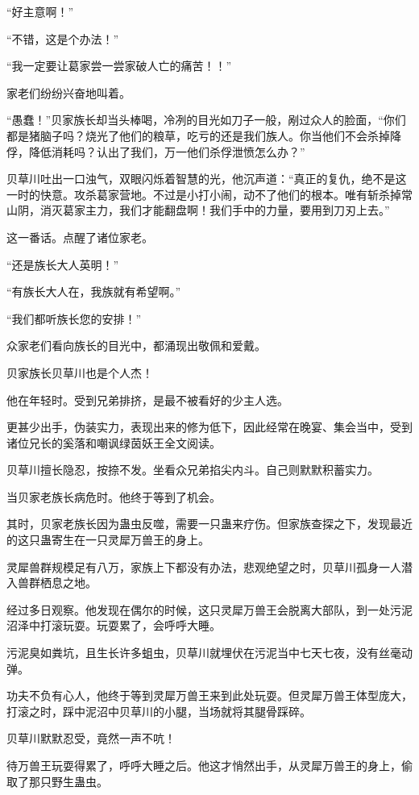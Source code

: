 \begin{this_body}
“好主意啊！”

“不错，这是个办法！”

“我一定要让葛家尝一尝家破人亡的痛苦！！”

家老们纷纷兴奋地叫着。

“愚蠢！”贝家族长却当头棒喝，冷冽的目光如刀子一般，剐过众人的脸面，“你们都是猪脑子吗？烧光了他们的粮草，吃亏的还是我们族人。你当他们不会杀掉降俘，降低消耗吗？认出了我们，万一他们杀俘泄愤怎么办？”

贝草川吐出一口浊气，双眼闪烁着智慧的光，他沉声道：“真正的复仇，绝不是这一时的快意。攻杀葛家营地。不过是小打小闹，动不了他们的根本。唯有斩杀掉常山阴，消灭葛家主力，我们才能翻盘啊！我们手中的力量，要用到刀刃上去。”

这一番话。点醒了诸位家老。

“还是族长大人英明！”

“有族长大人在，我族就有希望啊。”

“我们都听族长您的安排！”

众家老们看向族长的目光中，都涌现出敬佩和爱戴。

贝家族长贝草川也是个人杰！

他在年轻时。受到兄弟排挤，是最不被看好的少主人选。

更甚少出手，伪装实力，表现出来的修为低下，因此经常在晚宴、集会当中，受到诸位兄长的奚落和嘲讽绿茵妖王全文阅读。

贝草川擅长隐忍，按捺不发。坐看众兄弟掐尖内斗。自己则默默积蓄实力。

当贝家老族长病危时。他终于等到了机会。

其时，贝家老族长因为蛊虫反噬，需要一只蛊来疗伤。但家族查探之下，发现最近的这只蛊寄生在一只灵犀万兽王的身上。

灵犀兽群规模足有八万，家族上下都没有办法，悲观绝望之时，贝草川孤身一人潜入兽群栖息之地。

经过多日观察。他发现在偶尔的时候，这只灵犀万兽王会脱离大部队，到一处污泥沼泽中打滚玩耍。玩耍累了，会呼呼大睡。

污泥臭如粪坑，且生长许多蛆虫，贝草川就埋伏在污泥当中七天七夜，没有丝毫动弹。

功夫不负有心人，他终于等到灵犀万兽王来到此处玩耍。但灵犀万兽王体型庞大，打滚之时，踩中泥沼中贝草川的小腿，当场就将其腿骨踩碎。

贝草川默默忍受，竟然一声不吭！

待万兽王玩耍得累了，呼呼大睡之后。他这才悄然出手，从灵犀万兽王的身上，偷取了那只野生蛊虫。


\end{this_body}

